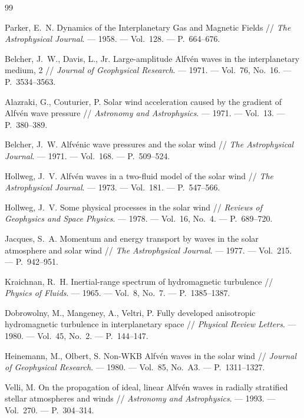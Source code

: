 \documentclass[11pt,a4paper]{article}
\begin{document}
\begin{thebibliography}{99}

Parker, E.~N. Dynamics of the Interplanetary Gas and Magnetic Fields // \emph{The Astrophysical Journal}. --- 1958. --- Vol.~128. --- P.~664--676.

Belcher, J.~W., Davis, L., Jr. Large-amplitude Alfv\'en waves in the interplanetary medium, 2 // \emph{Journal of Geophysical Research}. --- 1971. --- Vol.~76, No.~16. --- P.~3534--3563.

Alazraki, G., Couturier, P. Solar wind acceleration caused by the gradient of Alfv\'en wave pressure // \emph{Astronomy and Astrophysics}. --- 1971. --- Vol.~13. --- P.~380--389.

Belcher, J.~W. Alfv\'enic wave pressures and the solar wind // \emph{The Astrophysical Journal}. --- 1971. --- Vol.~168. --- P.~509--524.

Hollweg, J.~V. Alfv\'en waves in a two-fluid model of the solar wind // \emph{The Astrophysical Journal}. --- 1973. --- Vol.~181. --- P.~547--566.

Hollweg, J.~V. Some physical processes in the solar wind // \emph{Reviews of Geophysics and Space Physics}. --- 1978. --- Vol.~16, No.~4. --- P.~689--720.

Jacques, S.~A. Momentum and energy transport by waves in the solar atmosphere and solar wind // \emph{The Astrophysical Journal}. --- 1977. --- Vol.~215. --- P.~942--951.

Kraichnan, R.~H. Inertial-range spectrum of hydromagnetic turbulence // \emph{Physics of Fluids}. --- 1965. --- Vol.~8, No.~7. --- P.~1385--1387.

Dobrowolny, M., Mangeney, A., Veltri, P. Fully developed anisotropic hydromagnetic turbulence in interplanetary space // \emph{Physical Review Letters}. --- 1980. --- Vol.~45, No.~2. --- P.~144--147.

Heinemann, M., Olbert, S. Non-WKB Alfv\'en waves in the solar wind // \emph{Journal of Geophysical Research}. --- 1980. --- Vol.~85, No.~A3. --- P.~1311--1327.

Velli, M. On the propagation of ideal, linear Alfv\'en waves in radially stratified stellar atmospheres and winds // \emph{Astronomy and Astrophysics}. --- 1993. --- Vol.~270. --- P.~304--314.


\end{thebibliography}
\end{document}
